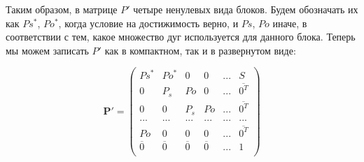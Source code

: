 Таким образом, в матрице $P'$ четыре ненулевых вида блоков. Будем обозначать 
их как $Ps^*$, $Po^*$, когда условие на достижимость верно, и $Ps$, $Po$ иначе, в соответствии с тем, какое множество дуг используется для данного блока. Теперь мы можем записать $P'$ как в компактном, так и в развернутом виде:

\begin{displaymath}
\mathbf{P'} =
\left( \begin{array}{ccccc|c}
Ps^* & Po^* & 0 & 0 & ... & S \\
0 & P_s & Po & 0 & ... & \overline {0^T} \\
0 & 0 & P_s & Po & ... & \overline {0^T} \\
... & ... & ... & ... & ... & ... \\
Po & 0 & 0 & 0 & ... & \overline {0^T} \\
\hline
\overline 0 &  \overline 0 &  \overline 0 &  \overline 0 & ... & 1 \\
\end{array} \right)
\end{displaymath}

